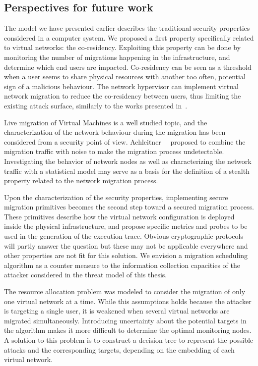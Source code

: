 \subsection{Perspectives for future work}

The model we have presented earlier describes the traditional security properties considered in a computer system. We proposed a first property specifically related to virtual networks: the co-residency. Exploiting this property can be done by monitoring the number of migrations happening in the infrastructure, and determine which end users are impacted. Co-residency can be seen as a threshold when a user seems to share physical resources with another too often, potential sign of a malicious behaviour.
The network hypervisor can implement virtual network migration to reduce the co-residency between users, thus limiting the existing attack surface, similarly to the works presented in~\cite{nomad-Moon2015b,malicious-atya2017}.

Live migration of Virtual Machines is a well studied topic, and the characterization of the network behaviour during the migration has been considered from a security point of view.
Achleitner~\etal~\cite{stealth-Achleitner2017a} proposed to combine the migration traffic with noise to make the migration process undetectable. Investigating the behavior of network nodes as well as characterizing the network traffic with a statistical model may serve as a basis for the definition of a stealth property related to the network migration process. 

Upon the characterization of the security properties, implementing secure migration primitives becomes the second step toward a secured migration process. These primitives describe how the virtual network configuration is deployed inside the physical infrastructure, and propose specific metrics and probes to be used in the generation of the execution trace. Obvious cryptographic protocols will partly answer the question but these may not be applicable everywhere and other properties are not fit for this solution. We envision a migration scheduling algorithm as a counter measure to the information collection capacities of the attacker considered in the threat model of this thesis.

The resource allocation problem was modeled to consider the migration of only one virtual network at a time. While this assumptions holds because the attacker is targeting a single user, it is weakened when several virtual networks are migrated simultaneously. Introducing uncertainty about the potential targets in the algorithm makes it more difficult to determine the optimal monitoring nodes. A solution to this problem is to construct a decision tree to represent the possible attacks and the corresponding targets, depending on the embedding of each virtual network.

